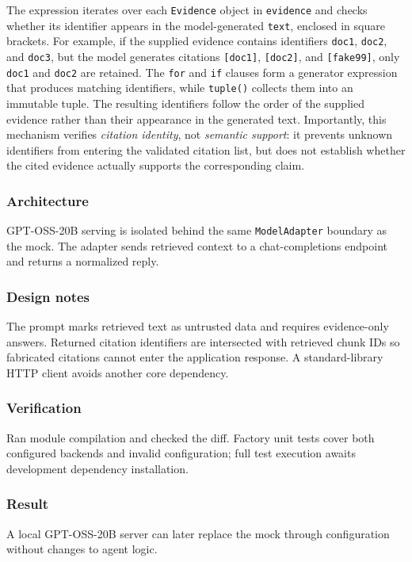 \noindent
The expression iterates over each \texttt{Evidence} object in
\texttt{evidence} and checks whether its identifier appears in the
model-generated \texttt{text}, enclosed in square brackets.
For example, if the supplied evidence contains identifiers
\texttt{doc1}, \texttt{doc2}, and \texttt{doc3}, but the model
generates citations \texttt{[doc1]}, \texttt{[doc2]}, and
\texttt{[fake99]}, only \texttt{doc1} and \texttt{doc2} are retained.
The \texttt{for} and \texttt{if} clauses form a generator expression
that produces matching identifiers, while \texttt{tuple()} collects
them into an immutable tuple. The resulting identifiers follow the
order of the supplied evidence rather than their appearance in the
generated text. Importantly, this mechanism verifies
\emph{citation identity}, not \emph{semantic support}: it prevents
unknown identifiers from entering the validated citation list, but
does not establish whether the cited evidence actually supports
the corresponding claim.

\subsubsection{Architecture}

GPT-OSS-20B serving is isolated behind the same \texttt{ModelAdapter} boundary as the mock. The adapter sends retrieved context to a chat-completions endpoint and returns a normalized reply.

\subsubsection{Design notes}

The prompt marks retrieved text as untrusted data and requires evidence-only answers. Returned citation identifiers are intersected with retrieved chunk IDs so fabricated citations cannot enter the application response. A standard-library HTTP client avoids another core dependency.

\subsubsection{Verification}

Ran module compilation and checked the diff. Factory unit tests cover both configured backends and invalid configuration; full test execution awaits development dependency installation.

\subsubsection{Result}

A local GPT-OSS-20B server can later replace the mock through configuration without changes to agent logic.

